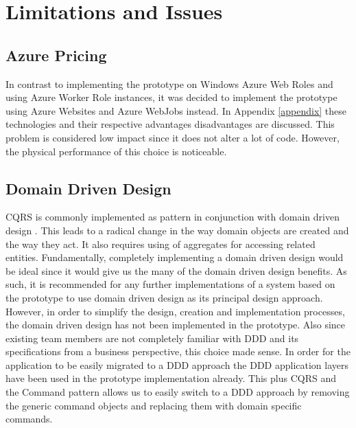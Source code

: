 \section{Limitations and Issues}
\subsection{Azure Pricing}
In contrast to implementing the prototype on Windows Azure Web Roles and using Azure Worker Role instances, it was decided to implement the prototype using Azure Websites and Azure WebJobs instead. In Appendix \ref{appendix} these technologies and their respective advantages disadvantages are discussed. This problem is considered low impact since it does not alter a lot of code. However, the physical performance of this choice is noticeable.

\subsection{Domain Driven Design}
CQRS  is commonly implemented as pattern in conjunction with domain driven design \cite{Swanson}. This leads to a radical change in the way domain objects are created and the way they act. It also requires using of aggregates for accessing related entities. Fundamentally, completely implementing a domain driven design would be ideal since it would give us the many of the domain driven design benefits. As such, it is recommended for any further implementations of a system based on the prototype to use domain driven design as its principal design approach. However, in order to simplify the design, creation and implementation processes, the domain driven design has not been implemented in the prototype. Also since existing team members are not completely familiar with DDD and its specifications from a business perspective, this choice made sense. In order for the application to be easily migrated to a DDD approach the DDD application layers have been used in the prototype implementation already. This plus CQRS and the Command pattern  allows us to easily switch to a DDD approach by removing the generic command objects and replacing them with domain specific commands.

